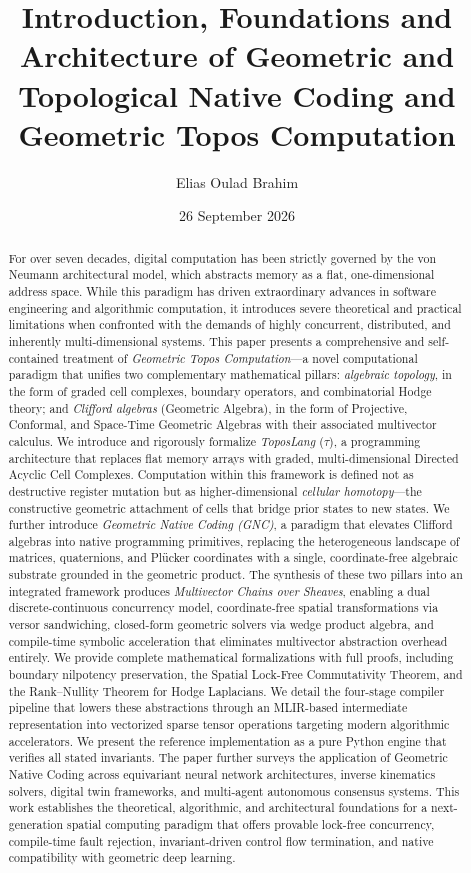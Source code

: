 \documentclass[manuscript, nonacm, review=false]{acmart}
\title[Geometric Topos Computation]{Introduction, Foundations and Architecture of Geometric and Topological Native Coding and Geometric Topos Computation}
\author{Elias Oulad Brahim}
\affiliation{%
  \institution{Independent Researcher, @Cloudhabil}
  \city{Krakow}
  \country{Poland}
}
\date{26 September 2026}
\theoremstyle{definition}
\theoremstyle{plain}
\newcommand{\toposLang}{\ensuremath{\tau}\text{-Lang}}
\begin{document}
\begin{abstract}
For over seven decades, digital computation has been strictly governed by the von Neumann architectural model, which abstracts memory as a flat, one-dimensional address space. While this paradigm has driven extraordinary advances in software engineering and algorithmic computation, it introduces severe theoretical and practical limitations when confronted with the demands of highly concurrent, distributed, and inherently multi-dimensional systems. This paper presents a comprehensive and self-contained treatment of \emph{Geometric Topos Computation}---a novel computational paradigm that unifies two complementary mathematical pillars: \emph{algebraic topology}, in the form of graded cell complexes, boundary operators, and combinatorial Hodge theory; and \emph{Clifford algebras} (Geometric Algebra), in the form of Projective, Conformal, and Space-Time Geometric Algebras with their associated multivector calculus. We introduce and rigorously formalize \emph{ToposLang} (\toposLang{}), a programming architecture that replaces flat memory arrays with graded, multi-dimensional Directed Acyclic Cell Complexes. Computation within this framework is defined not as destructive register mutation but as higher-dimensional \emph{cellular homotopy}---the constructive geometric attachment of cells that bridge prior states to new states. We further introduce \emph{Geometric Native Coding (GNC)}, a paradigm that elevates Clifford algebras into native programming primitives, replacing the heterogeneous landscape of matrices, quaternions, and Pl\"ucker coordinates with a single, coordinate-free algebraic substrate grounded in the geometric product. The synthesis of these two pillars into an integrated framework produces \emph{Multivector Chains over Sheaves}, enabling a dual discrete-continuous concurrency model, coordinate-free spatial transformations via versor sandwiching, closed-form geometric solvers via wedge product algebra, and compile-time symbolic acceleration that eliminates multivector abstraction overhead entirely. We provide complete mathematical formalizations with full proofs, including boundary nilpotency preservation, the Spatial Lock-Free Commutativity Theorem, and the Rank--Nullity Theorem for Hodge Laplacians. We detail the four-stage compiler pipeline that lowers these abstractions through an MLIR-based intermediate representation into vectorized sparse tensor operations targeting modern algorithmic accelerators. We present the reference implementation as a pure Python engine that verifies all stated invariants. The paper further surveys the application of Geometric Native Coding across equivariant neural network architectures, inverse kinematics solvers, digital twin frameworks, and multi-agent autonomous consensus systems. This work establishes the theoretical, algorithmic, and architectural foundations for a next-generation spatial computing paradigm that offers provable lock-free concurrency, compile-time fault rejection, invariant-driven control flow termination, and native compatibility with geometric deep learning.
\end{abstract}
\end{document}
